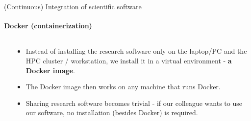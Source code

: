 \begin{frame}{(Continuous) Integration of scientific software} 
    \framesubtitle{Docker (containerization)}
    \vfill

    \begin{columns}
        \begin{column}[c]{0.4\textwidth}
            \begin{center}
            \end{center}
        \end{column}
        \begin{column}[c]{0.6\textwidth}
            \begin{itemize}
                \item Instead of installing the research software only on the laptop/PC and the HPC cluster / workstation, we install it in a virtual environment - \textbf{a Docker image}.
                \item The Docker image then works on any machine that runs Docker. 
                \item Sharing research software becomes trivial - if our colleague wants to use our software, no installation (besides Docker) is required. 
            \end{itemize}
        \end{column}
    \end{columns}


\end{frame}

